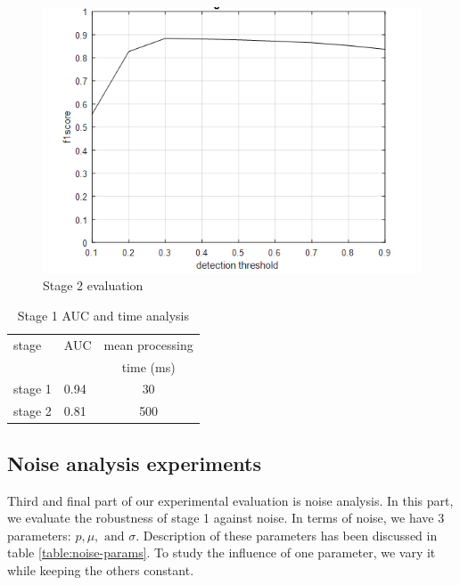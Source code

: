 \begin{figure}
    \centering
    \includegraphics[width=\linewidth]{images/f1-analysis-s2.png}
    \caption{Stage 2 evaluation}
    \label{fig:f1-analysis-s2}
\end{figure}



\begin{table}
\centering
\caption{Stage 1 AUC and time analysis} \vspace{5pt}
\label{table:auc-time-analysis-s1}
\begin{tabular}{|l|l|c|}
\hline
stage   	& AUC     & mean processing \\
            &         &  time (ms)  \\ \hline \hline
stage 1     & 0.94    & 30    \\
stage 2     & 0.81    & 500  \\ \hline
\end{tabular}
\end{table}


\subsection{Noise analysis experiments}
Third and final part of our experimental evaluation is noise analysis. In this part, we evaluate the robustness of stage 1 against noise. In terms of noise, we have 3 parameters: $p, \mu, \text{ and } \sigma$. Description of these parameters has been discussed in table \ref{table:noise-params}. To study the influence of one parameter, we vary it while keeping the others constant. 

